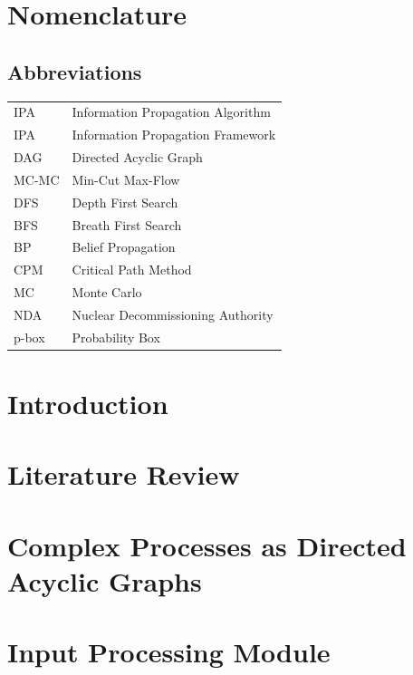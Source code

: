 \documentclass[12pt,a4paper,twoside]{report}
\begin{document}
\tableofcontents
\listoffigures
\listoftables
\listofalgorithms



\chapter*{Nomenclature}

\section*{Abbreviations}
\begin{tabular}{ll}
    IPA     & Information Propagation Algorithm \\
    IPA     & Information Propagation Framework \\
    DAG     & Directed Acyclic Graph \\
    MC-MC   & Min-Cut Max-Flow \\
    DFS     & Depth First Search \\
    BFS     & Breath First Search \\
    BP      & Belief Propagation \\
    CPM     & Critical Path Method \\
    MC      & Monte Carlo \\
    NDA     & Nuclear Decommissioning Authority \\
    p-box   & Probability Box \\
\end{tabular}




\chapter{Introduction}
\chapter{Literature Review}
\chapter{Complex Processes as Directed Acyclic Graphs}
\label{ch:system-model}

\chapter{Input Processing Module}
\label{ch:input-module}
 
\end{document}
